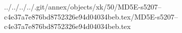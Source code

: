 ../../../../.git/annex/objects/xk/50/MD5E-s5207--c4e37a7e876bd8752326e94d04034beb.tex/MD5E-s5207--c4e37a7e876bd8752326e94d04034beb.tex